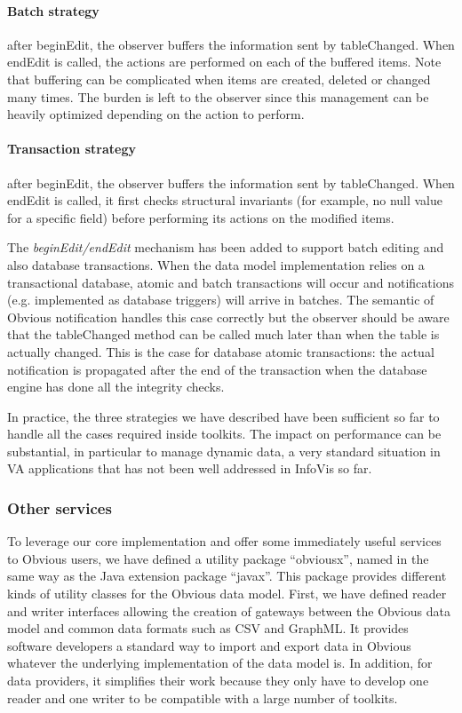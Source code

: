 \paragraph{Batch strategy} after beginEdit, the observer buffers the
  information sent by tableChanged.  When endEdit is called, the
  actions are performed on each of the buffered items.  Note that 
  buffering can be complicated when items are created, deleted or
  changed many times.  The burden is left to the observer since this
  management can be heavily optimized depending on the action to
  perform.

\paragraph{Transaction strategy} after beginEdit, the observer buffers the
  information sent by tableChanged.  When endEdit is called, it first
  checks structural invariants (for example, no null value for a
  specific field) before performing its actions on the modified items.

The \emph{beginEdit/endEdit} mechanism has been added to support batch
editing and also database transactions.  When the data model
implementation relies on a transactional database, atomic and batch
transactions will occur and notifications (e.g. implemented as
database triggers) will arrive in batches.  The semantic of Obvious
notification handles this case correctly but the observer should be
aware that the tableChanged method can be called much later than when
the table is actually changed.  This is the case for database atomic
transactions: the actual notification is propagated after the end of
the transaction when the database engine has done all the integrity
checks.

In practice, the three strategies we have described have been
sufficient so far to handle all the cases required inside toolkits.
The impact on performance can be substantial, in particular to manage
dynamic data, a very standard situation in VA
applications that has not been well addressed in InfoVis so far.


\subsubsection{Other services}

To leverage our core implementation and offer some immediately useful
services to Obvious users, we have defined a utility package
``obviousx'', named in the same way as the Java extension package
``javax''.  This package provides different kinds of utility classes
for the Obvious data model.  First, we have defined reader and writer
interfaces allowing the creation of gateways between the Obvious data
model and common data formats such as CSV and GraphML.  It provides
software developers a standard way to import and export data in
Obvious whatever the underlying implementation of the data model
is.  In addition, for data providers, it simplifies their work because
they only have to develop one reader and one writer to be compatible
with a large number of toolkits.

